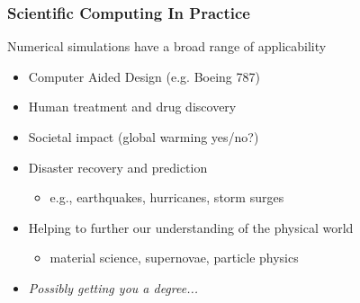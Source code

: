 \documentclass[mathserif]{beamer}
\begin{document}
\begin{frame}
  \frametitle{Scientific Computing In Practice}

  \begin{block}{Numerical simulations have a broad range of applicability}
    \begin{itemize}
    \item Computer Aided Design (e.g. Boeing 787)
    \item Human treatment and drug discovery
    \item Societal impact (global warming yes/no?)
    \item Disaster recovery and prediction 
	  \begin{itemize}
	   \item e.g., earthquakes, hurricanes, storm surges
	  \end{itemize}
    \item Helping to further our understanding of the physical world
	  \begin{itemize}
	   \item material science, supernovae, particle physics
	  \end{itemize}

    \item {\em Possibly getting you a degree...}
    \end{itemize}
\end{block}
\end{frame}
\end{document}
